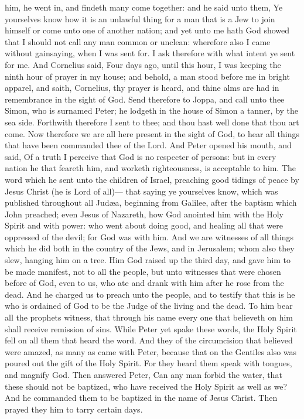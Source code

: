 him, he went in, and findeth many come together: and he said unto them, Ye yourselves know how it is an unlawful thing for a man that is a Jew to join himself or come unto one of another nation; and yet unto me hath God showed that I should not call any man common or unclean: wherefore also I came without gainsaying, when I was sent for. I ask therefore with what intent ye sent for me. And Cornelius said, Four days ago, until this hour, I was keeping the ninth hour of prayer in my house; and behold, a man stood before me in bright apparel, and saith, Cornelius, thy prayer is heard, and thine alms are had in remembrance in the sight of God. Send therefore to Joppa, and call unto thee Simon, who is surnamed Peter; he lodgeth in the house of Simon a tanner, by the sea side. Forthwith therefore I sent to thee; and thou hast well done that thou art come. Now therefore we are all here present in the sight of God, to hear all things that have been commanded thee of the Lord. And Peter opened his mouth, and said, Of a truth I perceive that God is no respecter of persons: but in every nation he that feareth him, and worketh righteousness, is acceptable to him. The word which he sent unto the children of Israel, preaching good tidings of peace by Jesus Christ (he is Lord of all)— that saying ye yourselves know, which was published throughout all Judæa, beginning from Galilee, after the baptism which John preached; even Jesus of Nazareth, how God anointed him with the Holy Spirit and with power: who went about doing good, and healing all that were oppressed of the devil; for God was with him. And we are witnesses of all things which he did both in the country of the Jews, and in Jerusalem; whom also they slew, hanging him on a tree. Him God raised up the third day, and gave him to be made manifest, not to all the people, but unto witnesses that were chosen before of God, even to us, who ate and drank with him after he rose from the dead. And he charged us to preach unto the people, and to testify that this is he who is ordained of God to be the Judge of the living and the dead. To him bear all the prophets witness, that through his name every one that believeth on him shall receive remission of sins.  While Peter yet spake these words, the Holy Spirit fell on all them that heard the word. And they of the circumcision that believed were amazed, as many as came with Peter, because that on the Gentiles also was poured out the gift of the Holy Spirit. For they heard them speak with tongues, and magnify God. Then answered Peter, Can any man forbid the water, that these should not be baptized, who have received the Holy Spirit as well as we? And he commanded them to be baptized in the name of Jesus Christ. Then prayed they him to tarry certain days. 

